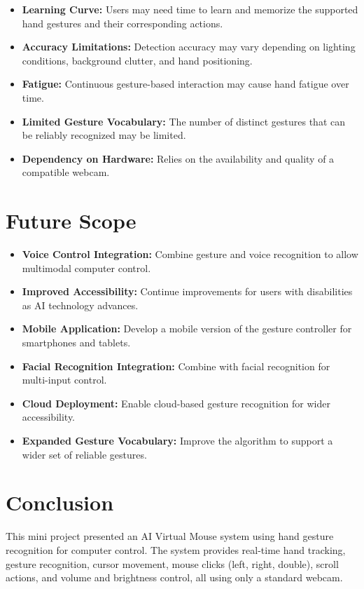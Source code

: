 \documentclass[12pt,a4paper]{report}
\begin{document}
\begin{enumerate}
\begin{itemize}[noitemsep]
  \item \textbf{Learning Curve:} Users may need time to learn and memorize the supported hand
    gestures and their corresponding actions.
  \item \textbf{Accuracy Limitations:} Detection accuracy may vary depending on lighting
    conditions, background clutter, and hand positioning.
  \item \textbf{Fatigue:} Continuous gesture-based interaction may cause hand fatigue over
    time.
  \item \textbf{Limited Gesture Vocabulary:} The number of distinct gestures that can be
    reliably recognized may be limited.
  \item \textbf{Dependency on Hardware:} Relies on the availability and quality of a
    compatible webcam.
\end{itemize}

\section{Future Scope}

\begin{itemize}[noitemsep]
  \item \textbf{Voice Control Integration:} Combine gesture and voice recognition to allow
    multimodal computer control.
  \item \textbf{Improved Accessibility:} Continue improvements for users with disabilities as
    AI technology advances.
  \item \textbf{Mobile Application:} Develop a mobile version of the gesture controller for
    smartphones and tablets.
  \item \textbf{Facial Recognition Integration:} Combine with facial recognition for
    multi-input control.
  \item \textbf{Cloud Deployment:} Enable cloud-based gesture recognition for wider
    accessibility.
  \item \textbf{Expanded Gesture Vocabulary:} Improve the algorithm to support a wider set of
    reliable gestures.
\end{itemize}

\section{Conclusion}

This mini project presented an AI Virtual Mouse system using hand gesture recognition for
computer control. The system provides real-time hand tracking, gesture recognition, cursor
movement, mouse clicks (left, right, double), scroll actions, and volume and brightness
control, all using only a standard webcam.


\end{enumerate}
\end{document}
